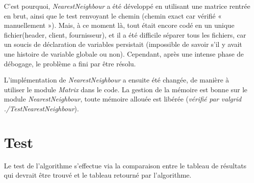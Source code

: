 C'est pourquoi, \textit{NearestNeighbour} a été développé en utilisant une matrice rentrée en brut, ainsi que le test renvoyant le chemin (chemin exact car vérifié « manuellement »).
Mais, à ce moment là, tout était encore codé en un unique fichier(header, client, fournisseur), et il a été difficile séparer tous les fichiers, car un soucis de déclaration de variables persistait (impossible de savoir s'il y avait une histoire de variable globale ou non). Cependant, après une intense phase de débogage, le problème a fini par être résolu.

L'implémentation de \textit{NearestNeighbour} a ensuite été changée, de manière à utiliser le module \textit{Matrix} dans le code. La gestion de la mémoire est bonne sur le module \textit{NearestNeighbour}, toute mémoire allouée est libérée (\textit{vérifié par valgrid ./TestNearestNeighbour}).

\section{Test}

Le test de l'algorithme s'effectue via la comparaison entre le tableau de résultats qui devrait être trouvé et le tableau retourné par l'algorithme.

\lstset{style=customc}

